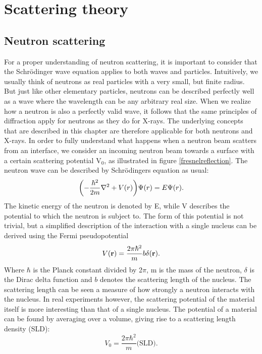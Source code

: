 \chapter{Scattering theory}\label{scatteringtheory}
\section{Neutron scattering}\label{neutronscattering}
For a proper understanding of neutron scattering, it is important to consider that the Schrödinger wave equation applies to both waves and particles. Intuitively, we usually think of neutrons as real particles with a very small, but finite radius. But just like other elementary particles, neutrons can be described perfectly well as a wave where the wavelength can be any arbitrary real size. When we realize how a neutron is also a perfectly valid wave, it follows that the same principles of diffraction apply for neutrons as they do for X-rays. The underlying concepts that are described in this chapter are therefore applicable for both neutrons and X-rays. In order to fully understand what happens when a neutron beam scatters from an interface, we consider an incoming neutron beam towards a surface with a certain scattering potential V$_0$, as illustrated in figure \ref{fresnelreflection}. The neutron wave can be described by Schrödingers equation as usual:
\begin{equation}
	\qty(-\frac{\hbar^2}{2m} \nabla^2 + V(r))\Psi(r) = E \Psi(r). 
\end{equation}
The kinetic energy of the neutron is denoted by E, while V describes the potential to which the neutron is subject to. The form of this potential is not trivial, but a simplified description of the interaction with a single nucleus can be derived using the Fermi pseudopotential \cite{nuclearpotential}
\begin{equation}\label{fermi_potential}
	V(\vb{r}) = \frac{2 \pi \hbar^2}{m} b \delta(\vb{r}).
\end{equation}
Where $\hbar$ is the Planck constant divided by 2$\pi$, m is the mass of the neutron, $\delta$ is the Dirac delta function and $b$ denotes the scattering length of the nucleus. The scattering length can be seen a measure of how strongly a neutron interacts with the nucleus. In real experiments however, the scattering potential of the material itself is more interesting than that of a single nucleus. The potential of a material can be found by averaging over a volume, giving rise to a scattering length density (SLD):
\begin{equation}\label{potential}
	V_0 = \frac{2 \pi \hbar^2}{m} \textrm{(SLD)}.
\end{equation}
